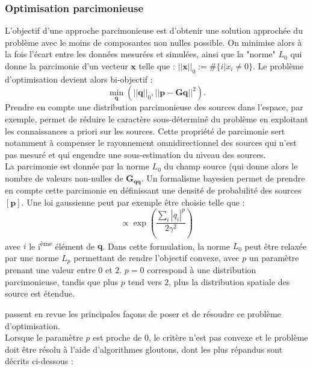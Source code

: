 \subsubsection{Optimisation parcimonieuse }
L'objectif d'une approche parcimonieuse est d'obtenir une solution approchée du problème avec le moins de composantes non nulles possible. On minimise alors à la fois l'écart entre les données mesurées et simulées, ainsi que la "norme" $L_0$ qui donne la parcimonie d'un vecteur $\bm{x}$ telle que : $||\bm{x}||_0 := \#\{i|x_i\neq0\}$. Le problème d'optimisation devient alors bi-objectif : 
\begin{equation}
	\min_{\bm{q}}(||\bm{q}||_0 , ||\bm{p}-\bm{G}\bm{q}||^2) .
	\label{bi-objectif}
\end{equation}
Prendre en compte une distribution parcimonieuse des sources dans l'espace, par exemple, permet de réduire le caractère sous-déterminé du problème en exploitant les connaissances a priori sur les sources. Cette propriété de parcimonie sert notamment à compenser le rayonnement omnidirectionnel des sources qui n'est pas mesuré et qui engendre une sous-estimation du niveau des sources. \\
La parcimonie est donnée par la norme $L_0$ du champ source (qui donne alors le nombre de valeurs non-nulles de $\bm{G_{qq}}$. Un formalisme bayesien permet de prendre en compte cette parcimonie en définissant une densité de probabilité des sources $[\bm{p}]$. Une loi gaussienne peut par exemple être choisie telle que : 
\begin{equation}
 [\bm{p}] \propto \exp\left(\frac{\sum_i |q_i|^p}{2\gamma^2}\right)
\end{equation}
avec $i$ le i\textsuperscript{ème} élément de $\bm{q}$. Dans cette formulation, la norme $L_0$ peut être relaxée par une norme $L_p$ permettant de rendre l'objectif convexe, avec $p$ un paramètre prenant une valeur entre $0$ et $2$. $p=0$ correspond à une distribution parcimonieuse, tandis que plus $p$ tend vers $2$, plus la distribution spatiale des source est étendue.

\cite{Tropp2010} passent en revue les principales façons de poser et de résoudre ce problème d'optimisation.\\
Lorsque le paramètre $p$ est proche de 0, le critère n'est pas convexe et le problème doit être résolu à l'aide d'algorithmes gloutons, dont les plus répandus sont décrits ci-dessous : 
